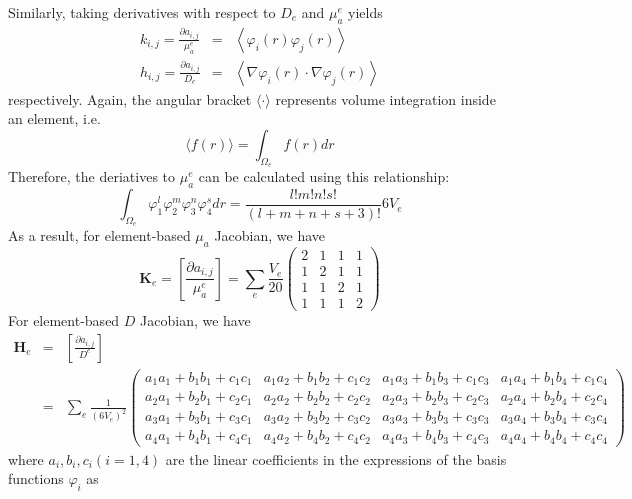 \documentclass[12pt]{book}               %
\begin{document}
Similarly, taking derivatives with respect to $D_e$ and $\mu_a^{e}$ yields
\begin{eqnarray}
k_{i,j}=\frac{\partial
a_{i,j}}{\mu_a^{e}}&=&\left\langle\varphi_i(r)\varphi_j(r)\right\rangle\\
h_{i,j}=\frac{\partial a_{i,j}}{D_e}&=&\left\langle
\nabla\varphi_i(r)\cdot\nabla\varphi_j(r)\right\rangle
\end{eqnarray}
respectively. Again, the angular bracket $\langle\cdot\rangle$ represents volume integration inside
an element, i.e.
\begin{equation}
\langle f(r) \rangle=\int_{\Omega_e}f(r)dr
\end{equation}
Therefore, the deriatives to $\mu_a^e$ can be calculated using this relationship:
\begin{equation}
\int_{\Omega_e}\varphi_1^l\varphi_2^m\varphi_3^n\varphi_4^sdr=\frac{l!m!n!s!}{(l+m+n+s+3)!}6V_e
\end{equation}
As a result, for element-based $\mu_a$ Jacobian, we have
\begin{equation}
\mathbf{K}_e=\left[\frac{\partial a_{i,j}}{\mu_a^{e}}\right]=\sum_e\frac{V_e}{20}\left(
\begin{array}{llll}
2 & 1 & 1 & 1 \\
1 & 2 & 1 & 1 \\
1 & 1 & 2 & 1 \\
1 & 1 & 1 & 2 
\end{array}
\right)
\end{equation}
For element-based $D$ Jacobian, we have
\begin{eqnarray}\nonumber
\mathbf{H}_e&=&\left[\frac{\partial
a_{i,j}}{D^{e}}\right]\\&=&\sum_e\frac{1}{(6V_e)^2}\left(
\begin{array}{llll}
a_1a_1+b_1b_1+c_1c_1 & a_1a_2+b_1b_2+c_1c_2 & a_1a_3+b_1b_3+c_1c_3 & a_1a_4+b_1b_4+c_1c_4 \\
a_2a_1+b_2b_1+c_2c_1 & a_2a_2+b_2b_2+c_2c_2 & a_2a_3+b_2b_3+c_2c_3 & a_2a_4+b_2b_4+c_2c_4 \\
a_3a_1+b_3b_1+c_3c_1 & a_3a_2+b_3b_2+c_3c_2 & a_3a_3+b_3b_3+c_3c_3 & a_3a_4+b_3b_4+c_3c_4 \\
a_4a_1+b_4b_1+c_4c_1 & a_4a_2+b_4b_2+c_4c_2 & a_4a_3+b_4b_3+c_4c_3 & a_4a_4+b_4b_4+c_4c_4
\end{array}
\right)
\end{eqnarray}
where $a_i,b_i,c_i (i=1,4)$ are the linear coefficients in the expressions of the basis functions $\varphi_i$ as
\end{document}

